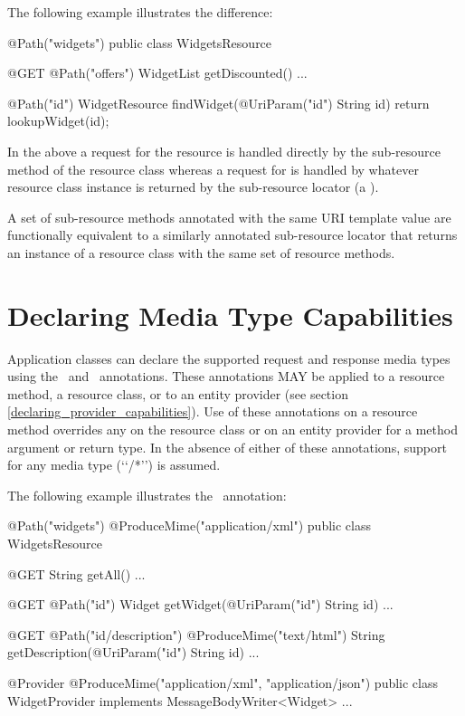 The following example illustrates the difference:

\begin{listing}{1}
@Path("widgets")
public class WidgetsResource {
  @GET
  @Path("offers")
  WidgetList getDiscounted() {...}
  
  @Path("{id}")
  WidgetResource findWidget(@UriParam("id") String id) {
    return lookupWidget(id);
  }
}\end{listing}

In the above a  request for the  resource is handled directly by the  sub-resource method of the resource class  whereas a  request for  is handled by whatever resource class instance is returned by the  sub-resource locator (a ).

\begin{nnnote}A set of sub-resource methods annotated with the same URI template value are functionally equivalent to a similarly annotated sub-resource locator that returns an instance of a resource class with the same set of resource methods.\end{nnnote}

\section{Declaring Media Type Capabilities}
\label{declaring_method_capabilities}

Application classes can declare the supported request and response media types using the \ProduceMime\ and \ConsumeMime\ annotations. These annotations MAY be applied to a resource method, a resource class, or to an entity provider (see section \ref{declaring_provider_capabilities}). Use of these annotations on a resource method overrides any on the resource class or on an entity provider for a method argument or return type. In the absence of either of these annotations, support for any media type (\lq\lq*/*\rq\rq) is assumed.

The following example illustrates the \ProduceMime\ annotation:

\begin{listing}{1}
@Path("widgets")
@ProduceMime("application/xml")
public class WidgetsResource {
  
  @GET
  String getAll() {...}
  
  @GET
  @Path("{id}")
  Widget getWidget(@UriParam("id") String id) {...}

  @GET
  @Path("{id}/description")
  @ProduceMime("text/html")
  String getDescription(@UriParam("id") String id) {...}
}

@Provider
@ProduceMime({"application/xml", "application/json"})
public class WidgetProvider implements MessageBodyWriter<Widget> {...}
\end{listing}

